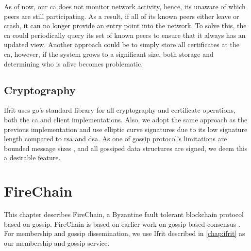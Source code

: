 \documentclass[USenglish]{uit-thesis}
\begin{document}


As of now, our \gls{ca} does not monitor network activity, hence, its unaware of which peers are still participating.
As a result, if all of its known peers either leave or crash, it can no longer provide an entry point into the network.
To solve this, the \gls{ca} could periodically query its set of known peers to ensure that it always has an updated view.
Another approach could be to simply store all certificates at the \gls{ca}, however, if the system grows to a significant size, both storage and determining who is alive becomes problematic.



\section{Cryptography}
Ifrit uses \gls{go}'s standard library for all cryptography and certificate operations, both the \gls{ca} and client implementations.
Also, we adopt the same approach as the previous implementation \cite{flies} and use elliptic curve signatures due to its low signature length compared to \gls{rsa} and \gls{dsa}.
As one of gossip protocol's limitations are bounded message sizes \cite{gossip_promise}, and all gossiped data structures are signed, we deem this a desirable feature. 






\chapter{FireChain} \label{chap:firechain}
This chapter describes FireChain, a Byzantine fault tolerant blockchain protocol based on gossip.
FireChain is based on earlier work on gossip based consensus \cite{vanblock}.
For membership and gossip dissemination, we use Ifrit described in \autoref{chap:ifrit} as our membership and gossip service.
\end{document}
